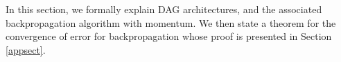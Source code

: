 \documentclass{jcmlatex}
\begin{document}
In this section, we formally explain  DAG architectures, and the associated backpropagation algorithm with momentum.  We then state a theorem for the convergence of error for backpropagation whose proof is presented in Section \ref{appsect}.
\end{document}
